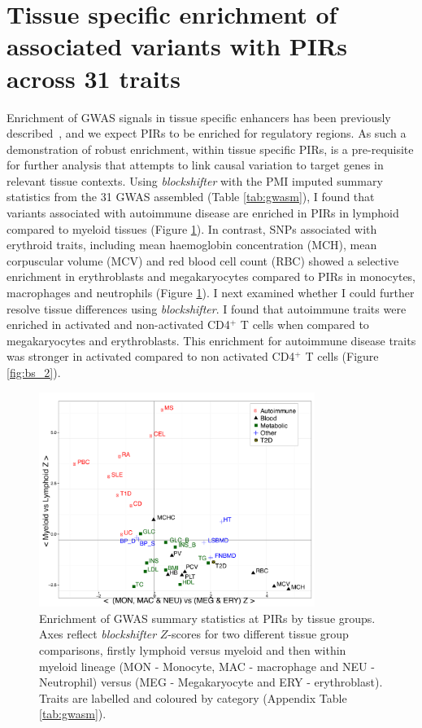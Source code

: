 \documentclass[a4paper,11pt]{report}
\begin{document}
\section{Tissue specific enrichment of associated variants with PIRs across 31 traits}
Enrichment of GWAS signals in tissue specific enhancers has been previously described~\citep{MauranoHumbertRynesEtAl2012}, and we expect PIRs to be enriched for regulatory regions. As such a demonstration of robust enrichment, within tissue specific PIRs, is a pre-requisite for further analysis that attempts to link causal variation to target genes in relevant tissue contexts.  Using \textit{blockshifter} with the PMI imputed summary statistics from the 31 GWAS assembled (Table \ref{tab:gwasm}), I found that variants associated with autoimmune disease are enriched in PIRs in lymphoid compared to myeloid tissues (Figure \ref{fig:bs_1}). In contrast, SNPs associated with erythroid traits, including mean haemoglobin concentration (MCH), mean corpuscular volume (MCV) and red blood cell count (RBC) showed a selective enrichment in erythroblasts and megakaryocytes compared to PIRs in monocytes, macrophages and neutrophils (Figure \ref{fig:bs_1}). I next examined whether I could further resolve tissue differences using \textit{blockshifter}. I found that autoimmune traits were enriched in activated and non-activated CD4$^{+}$ T cells when compared to megakaryocytes and erythroblasts. This enrichment for autoimmune disease traits was stronger in activated  compared to non activated CD4$^{+}$ T cells (Figure \ref{fig:bs_2}).


\begin{figure}[h]
\centering
\includegraphics[width=0.8\textwidth]{block_shifter_scatter.pdf}
\caption{Enrichment of GWAS summary statistics at PIRs by tissue groups. Axes reflect \textit{blockshifter} $Z$-scores for two different tissue group comparisons, firstly lymphoid versus myeloid and then within myeloid lineage (MON - Monocyte, MAC - macrophage and NEU - Neutrophil) versus (MEG - Megakaryocyte and ERY - erythroblast). Traits are labelled and coloured by category (Appendix Table \ref{tab:gwasm}).}
\label{fig:bs_1}
\end{figure}
\end{document}
